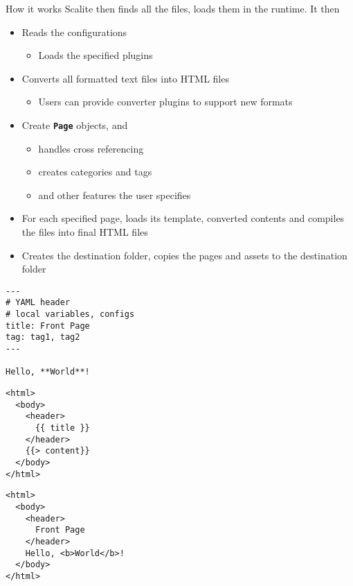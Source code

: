 \documentclass[compress, aspectratio=169]{beamer}
\renewcommand{\imp}[1]{\texttt{\textbf{#1}}}
\begin{document}
\begin{frame}[fragile]{How it works}
    Scalite then finds all the files, loads them in the runtime. It then
    \begin{itemize}
        \item Reads the configurations
            \begin{itemize}
                \item Loads the specified plugins
            \end{itemize}
            \pause
        \item Converts all formatted text files into HTML files
            \begin{itemize}
                \item Users can provide converter plugins to support new formats 
            \end{itemize}
            \pause
        \item Create \imp{Page} objects, and 
            \begin{itemize}
                \item handles cross referencing
                \item creates categories and tags
                \item and other features the user specifies
            \end{itemize}
            \pause
        \item For each specified page, loads its template, converted contents and
            compiles the files into final HTML files
            \pause
        \item Creates the destination folder, copies the pages and assets to the
            destination folder
    \end{itemize}
\end{frame}

\begin{frame}[fragile]
    \vspace{-1.4em}
    \begin{minipage}[t]{.47\linewidth}
    \begin{lstlisting}[style=mymd, caption={hello_world.md}]
---
# YAML header
# local variables, configs
title: Front Page
tag: tag1, tag2
---

Hello, **World**!
    \end{lstlisting}
    \end{minipage}\hfill%
    \begin{minipage}[t]{.47\linewidth}
    \begin{lstlisting}[style=myhtml, caption={page.mustache}]
<html>
  <body>
    <header>
      {{ title }}
    </header>
    {{> content}}
  </body>
</html>
    \end{lstlisting}
    \end{minipage}

    \begin{lstlisting}[style=myhtml, caption={hello_world.html}]
<html>
  <body>
    <header>
      Front Page
    </header>
    Hello, <b>World</b>!
  </body>
</html>
    \end{lstlisting}
\end{frame}
\end{document}
